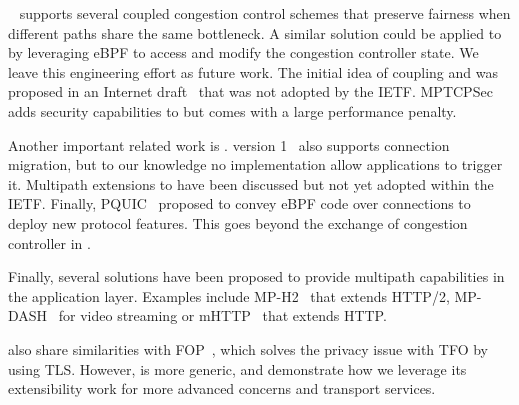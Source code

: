 \mptcp~\cite{raiciu2012hard,rfc6824} supports several coupled congestion 
control schemes
\cite{peng2014multipath,wischik2011design,khalili2013mptcp} that preserve
fairness when different paths share the same bottleneck. A similar solution 
could be applied to \tcpls by leveraging eBPF to access and modify the 
congestion controller state. We leave this engineering effort as future work.
The initial idea of coupling \mptcp and \tls was proposed in an
Internet draft~\cite{draft-paasch-mptcp-ssl-00} that was not adopted by the
IETF. MPTCPSec~\cite{jadin2017securing} adds security capabilities to \mptcp but
comes with a large performance penalty.

Another important related work is \quic. %
\quic version 1~\cite{rfc9000} also supports connection
migration, but to our knowledge no implementation allow applications to trigger 
it. %
Multipath extensions
\cite{viernickel2018multipath,de2017multipath,draft-liu-multipath-quic-02}
to \quic have been discussed but not yet adopted within the IETF. Finally,
PQUIC~\cite{de2019pluginizing} proposed to convey eBPF code over \quic
connections to deploy new protocol features. This goes beyond the exchange of
congestion controller in \tcpls.

Finally, several solutions have been proposed to provide multipath capabilities
in the application layer. Examples include MP-H2~\cite{nikravesh2019mp} that
extends HTTP/2, MP-DASH~\cite{han2016mp} for video streaming or mHTTP~\cite{kim2014multi} that extends HTTP.

\tcpls also share similarities with \tls FOP~\cite{sy2020enhanced}, which 
solves the privacy issue with TFO by using TLS. However, \tcpls is more generic,
and demonstrate how we leverage its extensibility work for more advanced 
concerns and transport services.


